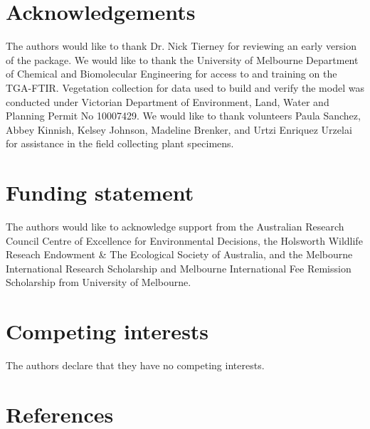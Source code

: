 \documentclass{jors}\usepackage[]{graphicx}\usepackage[]{color}
\begin{document}
\section*{Acknowledgements}
The authors would like to thank Dr. Nick Tierney for reviewing an early version of the package. We would like to thank the University of Melbourne Department of Chemical and Biomolecular Engineering for access to and training on the TGA-FTIR. Vegetation collection for data used to build and verify the model was conducted under Victorian Department of Environment, Land, Water and Planning Permit No 10007429. We would like to thank volunteers Paula Sanchez, Abbey Kinnish, Kelsey Johnson, Madeline Brenker, and Urtzi Enriquez Urzelai for assistance in the field collecting plant specimens.

\section*{Funding statement}
The authors would like to acknowledge support from the Australian Research Council Centre of Excellence for Environmental Decisions, the Holsworth Wildlife Reseach Endowment \& The Ecological Society of Australia, and the Melbourne International Research Scholarship and Melbourne International Fee Remission Scholarship from University of Melbourne.

\section*{Competing interests}
The authors declare that they have no competing interests.

\section*{References}


\vspace{2cm}
\end{document}
